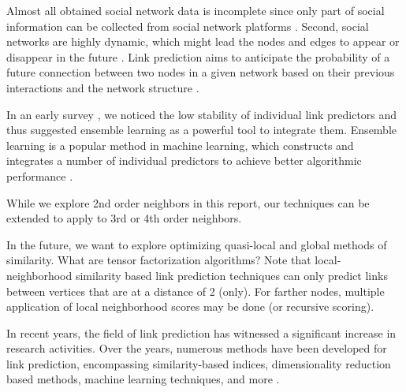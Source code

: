 Almost all obtained social network data is incomplete since only part of social information can be collected from social network platforms \cite{wang2014link}. Second, social networks are highly dynamic, which might lead the nodes and edges to appear or disappear in the future \cite{wang2014link}.
Link prediction aims to anticipate the probability of a future connection between two nodes in a given network based on their previous interactions and the network structure \cite{arrar2023comprehensive}.


In an early survey \cite{lu2011link}, we noticed the low stability of individual link predictors and thus suggested ensemble learning as a powerful tool to integrate them. Ensemble learning is a popular method in machine learning, which constructs and integrates a number of individual predictors to achieve better algorithmic performance \cite{zhou2012ensemble}.

While we explore 2nd order neighbors in this report, our techniques can be extended to apply to 3rd or 4th order neighbors.


In the future, we want to explore optimizing quasi-local and global methods of similarity. What are tensor factorization algorithms? Note that local-neighborhood similarity based link prediction techniques can only predict links between vertices that are at a distance of 2 (only). For farther nodes, multiple application of local neighborhood scores may be done (or recursive scoring).



In recent years, the field of link prediction has witnessed a significant increase in research activities. Over the years, numerous methods have been developed for link prediction, encompassing similarity-based indices, dimensionality reduction based methods, machine learning techniques, and more \cite{arrar2023comprehensive}.

